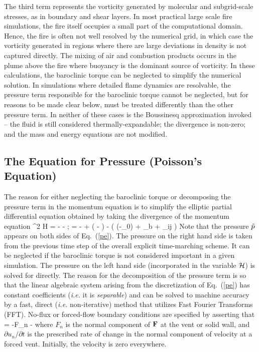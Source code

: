 \documentclass[11pt]{book}
\begin{document}
The third term represents the vorticity generated by molecular and subgrid-scale stresses, as in boundary and shear layers.
In most practical large scale fire simulations, the fire itself occupies a small part of
the computational domain. Hence, the fire is often not well resolved by
the numerical grid, in which case the vorticity generated in regions where there are
large deviations in density is not captured
directly. The mixing of air and combustion products occurs in the plume above the fire where
buoyancy is the dominant source of vorticity. In these calculations, the baroclinic torque
can be neglected to simplify the numerical solution. In simulations where detailed flame dynamics are
resolvable, the pressure term responsible for the baroclinic torque cannot be neglected, but for reasons
to be made clear below, must be treated differently than the other pressure term.
In neither of these cases is the Boussinesq approximation
invoked -- the fluid is still considered thermally-expandable; the divergence is non-zero; and the mass and
energy equations are not modified.

\subsection{The Equation for Pressure (Poisson's Equation)}

The reason for either neglecting the baroclinic torque or decomposing the pressure term in the
momentum equation is to simplify the
elliptic partial differential equation obtained by
taking the divergence of the momentum equation
\be \nabla^2 {\cal H} =
     - - \nabla \cdot \bF
    \quad ; \quad \bF = - \bu\times\bo + \left(  -
    \right) \nabla \tp - 
    \Big( (\rho-\rho_0) \bg + \bof_b + \nabla \cdot \btau_{ij} \Big)
   \label{pe}\ee
Note that the pressure $\tilde{p}$ appears on both sides of Eq.~(\ref{pe}). The
pressure on the right hand side is taken from the previous time step of the
overall explicit time-marching scheme. It can be neglected if the baroclinic torque is
not considered important in a given simulation. The pressure on the left hand side (incorporated
in the variable $\cal H$) is solved for directly.
The reason for the decomposition of the pressure term is so that the linear algebraic system
arising from the discretization of Eq.~(\ref{pe})
has constant coefficients ({\em i.e.} it is {\em separable}) and can be solved to machine accuracy
by a fast, direct ({\em i.e.} non-iterative) method that utilizes
Fast Fourier Transforms (FFT).
No-flux or forced-flow boundary conditions are specified by asserting that
\be {} = -F_n -  \label{bc} \ee
where $F_n$ is the normal component of ${\bf F}$ at the vent or solid wall,
and $\partial u_n/\partial t$ is the prescribed rate of change
in the normal component of
velocity at a forced vent. Initially, the velocity is zero everywhere.
\end{document}
